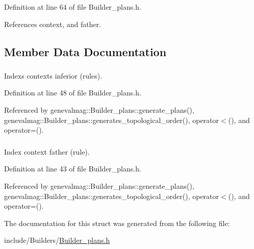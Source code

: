 Definition at line 64 of file Builder\_\-plans.h.

References context, and father.

\subsection{Member Data Documentation}
\hypertarget{structgenevalmag_1_1c__rule_f0b0004a1f307e5cb18ed26d3e983f1d}{
\subsubsection[{context}]{}}
\label{structgenevalmag_1_1c__rule_f0b0004a1f307e5cb18ed26d3e983f1d}


Indexs contexts inferior (rules). 



Definition at line 48 of file Builder\_\-plans.h.

Referenced by genevalmag::Builder\_\-plans::generate\_\-plans(), genevalmag::Builder\_\-plans::generates\_\-topological\_\-order(), operator$<$(), and operator=().\hypertarget{structgenevalmag_1_1c__rule_be7fed1600af3652ab298ac2a897b18f}{
\subsubsection[{father}]{}}
\label{structgenevalmag_1_1c__rule_be7fed1600af3652ab298ac2a897b18f}


Index context father (rule). 



Definition at line 43 of file Builder\_\-plans.h.

Referenced by genevalmag::Builder\_\-plans::generate\_\-plans(), genevalmag::Builder\_\-plans::generates\_\-topological\_\-order(), operator$<$(), and operator=().

The documentation for this struct was generated from the following file:\begin{CompactItemize}
\item 
include/Builders/\hyperlink{Builder__plans_8h}{Builder\_\-plans.h}\end{CompactItemize}
